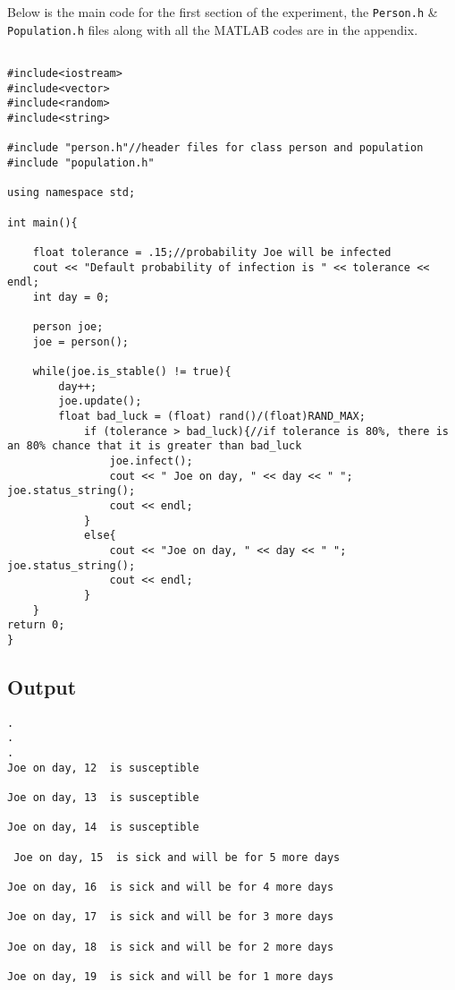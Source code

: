 \documentclass[paper=a4, fontsize=11pt]{scrartcl}
\begin{document}
Below is the main code for the first section of the experiment, the \texttt{Person.h} \& \texttt{Population.h} files along with all the MATLAB codes are in the appendix.\\

\begin{lstlisting}

#include<iostream>
#include<vector>
#include<random>
#include<string>

#include "person.h"//header files for class person and population
#include "population.h"

using namespace std;

int main(){

    float tolerance = .15;//probability Joe will be infected
    cout << "Default probability of infection is " << tolerance << endl;
    int day = 0;

    person joe;
    joe = person();
    
    while(joe.is_stable() != true){
        day++;
        joe.update();
        float bad_luck = (float) rand()/(float)RAND_MAX; 
            if (tolerance > bad_luck){//if tolerance is 80%, there is an 80% chance that it is greater than bad_luck
                joe.infect();
                cout << " Joe on day, " << day << " "; joe.status_string();
                cout << endl;
            }
            else{
                cout << "Joe on day, " << day << " "; joe.status_string();
                cout << endl;
            }
    }
return 0;
}
\end{lstlisting}
\newpage
\subsection{Output}
\begin{verbatim}
.
.
.
Joe on day, 12  is susceptible

Joe on day, 13  is susceptible

Joe on day, 14  is susceptible

 Joe on day, 15  is sick and will be for 5 more days

Joe on day, 16  is sick and will be for 4 more days

Joe on day, 17  is sick and will be for 3 more days

Joe on day, 18  is sick and will be for 2 more days

Joe on day, 19  is sick and will be for 1 more days

\end{verbatim}
\end{document}
